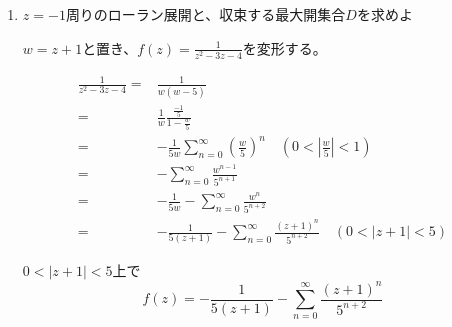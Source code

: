 \documentclass[12pt,b5paper]{ltjsarticle}
\begin{document}
\begin{enumerate}
\begin{enumerate}
              \hrulefill
        \item $z=-1$周りのローラン展開と、収束する最大開集合$D$を求めよ

              \dotfill

              $w=z+1$と置き、$f(z)=\frac{1}{z^2-3z-4}$を変形する。

              \begin{align}
               \frac{1}{z^2-3z-4} =& \frac{1}{w(w-5)}\\
               =& \frac{1}{w}\frac{\frac{-1}{5}}{1-\frac{w}{5}}\\
               =& -\frac{1}{5w}\sum_{n=0}^{\infty}\left(\frac{w}{5}\right)^n
                   \quad (0<\left| \frac{w}{5} \right| <1)\\
               =& -\sum_{n=0}^{\infty} \frac{w^{n-1}}{5^{n+1}}\\
               =& -\frac{1}{5w}-\sum_{n=0}^{\infty} \frac{w^{n}}{5^{n+2}}\\
               =& -\frac{1}{5(z+1)}-\sum_{n=0}^{\infty} \frac{(z+1)^{n}}{5^{n+2}}
                   \quad (0<\lvert z+1 \rvert <5)
              \end{align}

              $0<\lvert z+1 \rvert <5$上で
              \begin{equation}
               f(z) = -\frac{1}{5(z+1)}-\sum_{n=0}^{\infty} \frac{(z+1)^{n}}{5^{n+2}}
              \end{equation}
       \end{enumerate}
\end{enumerate}
\end{document}

